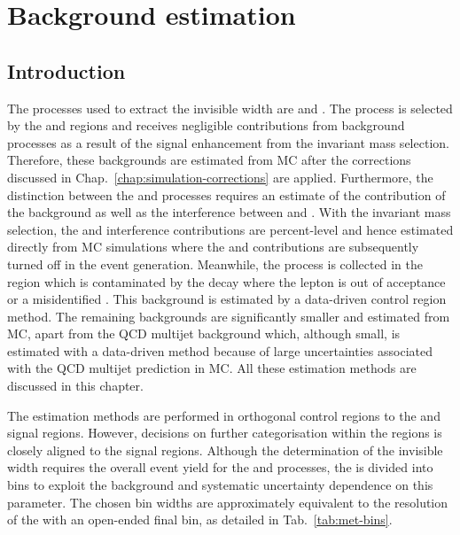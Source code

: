 \chapter{Background estimation}
\label{chap:backgrounds}


\section{Introduction}

The processes used to extract the \PZ invisible width are \IZvv and \IZll. The
\IZll process is selected by the \dimuplusjets and \dieleplusjets regions and
receives negligible contributions from background processes as a result of the signal enhancement from the
invariant mass selection. Therefore, these backgrounds are estimated from MC
after the corrections discussed in Chap.~\ref{chap:simulation-corrections} are
applied. Furthermore, the distinction between the \IDYll and \IZll processes
requires an estimate of the contribution of the \Pgstar background as well as
the interference between \PZ and \Pgstar. With the invariant mass selection,
the \Pgstar and interference contributions are percent-level and hence
estimated directly from MC simulations where the \PZ and \Pgstar contributions
are subsequently turned off in the event generation. Meanwhile, the \IZvv
process is collected in the \metplusjets region which is contaminated by the
\IWlv decay where the lepton is out of acceptance or a misidentified \Ptauh.
This \IWlv background is estimated by a data-driven control region method. The
remaining backgrounds are significantly smaller and estimated from MC, apart
from the QCD multijet background which, although small, is estimated with a
data-driven method because of large uncertainties associated with the QCD
multijet prediction in MC. All these estimation methods are discussed in this
chapter.

The estimation methods are performed in orthogonal control regions to the
\metplusjets and \diellplusjets signal regions. However, decisions on further
categorisation within the regions is closely aligned to the signal regions.
Although the determination of the \PZ invisible width requires the overall
event yield for the \IZvv and \IZll processes, the \recoil is divided into
bins to exploit the background and systematic uncertainty dependence on this
parameter. The chosen bin widths are approximately equivalent to the resolution
of the \recoil with an open-ended final bin, as detailed in Tab.~\ref{tab:met-bins}.

